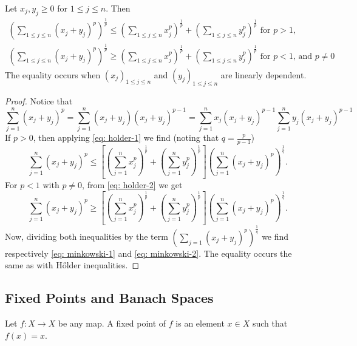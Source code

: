 \begin{proposition}\label{prop: minkowski-ineq}
Let \(x_j, y_j \geq 0\) for \(1 \leq j \leq n\). Then
\begin{gather}
\label{eq: minkowski-1}
\left(\sum_{1 \leq j \leq n} (x_j + y_j)^p \right)^{\frac 1 p}
\leq \left(\sum_{1 \leq j \leq n} x_j^p \right)^{\frac 1 p}
+ \left(\sum_{1 \leq j \leq n} y_j^p\right)^{\frac 1 p}
\text{ for } p > 1,
\\ \label{eq: minkowski-2}
\left(\sum_{1 \leq j \leq n} (x_j + y_j)^p \right)^{\frac 1 p}
\geq \left(\sum_{1 \leq j \leq n} x_j^p \right)^{\frac 1 p}
+ \left(\sum_{1 \leq j \leq n} y_j^p\right)^{\frac 1 p}
\text{ for } p < 1 \text{, and } p \neq 0
\end{gather}
The equality occurs when \((x_j)_{1 \leq j \leq n}\) and \((y_j)_{1 \leq j
\leq n}\) are linearly dependent.
\end{proposition}

\begin{proof}
Notice that
\[
\sum_{j=1}^n (x_j + y_j)^p = \sum_{j=1}^n (x_j + y_j)(x_j + y_j)^{p-1}
= \sum_{j=1}^n x_j (x_j + y_j)^{p-1} \sum_{j=1}^n y_j (x_j + y_j)^{p-1}
\]
If \(p > 0\), then applying \cref{eq: holder-1} we find (noting that \(q =
\frac p {p - 1}\))
\[
\sum_{j=1}^n (x_j + y_j)^p \leq \left[
    \left(\sum_{j=1}^n x_j^p\right)^{\frac 1 p}
    + \left(\sum_{j=1}^n y_j^p\right)^{\frac 1 p}
\right] \left(\sum_{j=1}^n (x_j + y_j)^p\right)^{\frac 1 q}.
\]
For \(p < 1\) with \(p \neq 0\), from \cref{eq: holder-2} we get
\[
\sum_{j=1}^n (x_j + y_j)^p \geq \left[
    \left(\sum_{j=1}^n x_j^p\right)^{\frac 1 p}
    + \left(\sum_{j=1}^n y_j^p\right)^{\frac 1 p}
\right] \left(\sum_{j=1}^n (x_j + y_j)^p\right)^{\frac 1 q}.
\]
Now, dividing both inequalities by the term \(\left(\sum_{j=1} (x_j + y_j)^p
\right)^{\frac 1 q}\) we find respectively \cref{eq: minkowski-1} and
\cref{eq: minkowski-2}. The equality occurs the same as with H\H{o}lder
inequalities.
\end{proof}

\subsection{Fixed Points and Banach Spaces}

\begin{definition}\label{def:fixed-point}
Let \(f: X \to X\) be any map. A fixed point of \(f\) is an element \(x \in X\)
such that \(f(x) = x\).
\end{definition}

